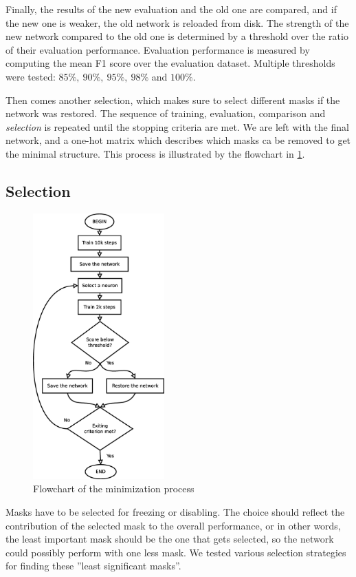 \documentclass[12pt]{report}
\begin{document}
\label{thresholds}Finally, the results of the new evaluation and the old one are compared, and if the new one is weaker, the old network is reloaded from disk. The strength of the new network compared to the old one is determined by a threshold over the ratio of their evaluation performance. Evaluation performance is measured by computing the mean F1 score over the evaluation dataset. Multiple thresholds were tested: $ 85\%,\ 90\%,\ 95\%,\ 98\%$ and $100\%$.

Then comes another selection, which makes sure to select different masks if the network was restored. The sequence of training, evaluation, comparison and \textit{selection} is repeated until the stopping criteria are met. We are left with the final network, and a one-hot matrix which describes which masks ca be removed to get the minimal structure. This process is illustrated by the flowchart in \ref{flow}.
\subsection{Selection}
\begin{figure}
	\includegraphics[width=0.45\textwidth]{dia/flow.eps}
	\caption{Flowchart of the minimization process}
	\label{flow}
\end{figure}
Masks have to be selected for freezing or disabling. The choice should reflect the contribution of the selected mask to the overall performance, or in other words, the least important mask should be the one that gets selected, so the network could possibly perform with one less mask. We tested various selection strategies for finding these ''least significant masks''.
\end{document}
